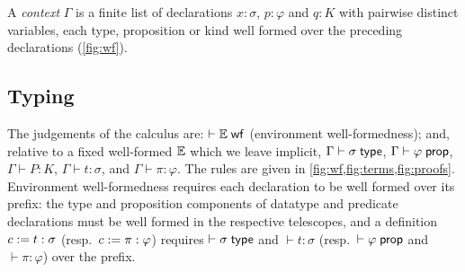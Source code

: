 \begin{definition}[Contexts]
A \emph{context} $\Gamma$ is a finite list of declarations $x : \sigma$,
$p : \varphi$ and $q : K$ with pairwise distinct variables, each type,
proposition or kind well formed over the preceding declarations
(\cref{fig:wf}).
\end{definition}

\subsection{Typing}
\label{sec:calculus-typing}

The judgements of the calculus are: $\vdash \mathbb{E} \;\mathsf{wf}$ (environment
well-formedness); and, relative to a fixed well-formed $\mathbb{E}$ which we
leave implicit, $\Gamma \vdash \sigma \;\mathsf{type}$, $\Gamma \vdash \varphi
\;\mathsf{prop}$, $\Gamma \vdash P : K$, $\Gamma \vdash t : \sigma$, and $\Gamma
\vdash \pi : \varphi$.  The rules are given in
\cref{fig:wf,fig:terms,fig:proofs}.  Environment well-formedness requires
each declaration to be well formed over its prefix: the type and
proposition components of datatype and predicate declarations must be well
formed in the respective telescopes, and a definition $c \mathrel{:=} t : \sigma$
(resp.\ $c \mathrel{:=} \pi : \varphi$) requires $\vdash \sigma \;\mathsf{type}$ and
$\vdash t : \sigma$ (resp.\ $\vdash \varphi \;\mathsf{prop}$ and $\vdash \pi :
\varphi$) over the prefix.

